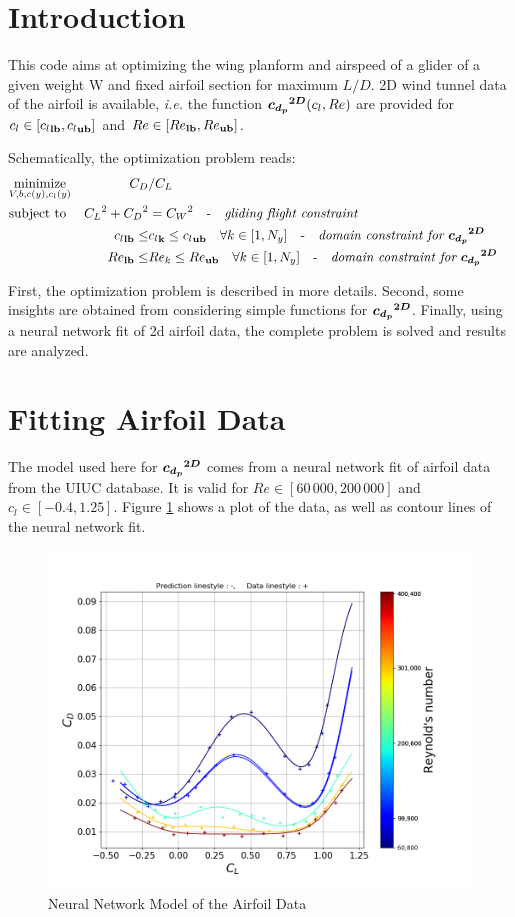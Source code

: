 \documentclass[letterpaper,12pt]{article}
\begin{document}
\section{Introduction}

This code aims at optimizing the wing planform and airspeed of a glider of a given weight W and fixed airfoil section for maximum $L/D$.
2D wind tunnel data of the airfoil is available, {\it i.e.} the function
$\boldsymbol{{c_{d_p}}^{2D}}(c_l, Re)$ are provided for  $c_l \in [{c_l}_{\bf lb}, {c_l}_{\bf ub}]$   and $Re \in [{Re}_{\bf lb}, {Re}_{\bf ub}]$.

Schematically, the optimization problem reads:
\begin{align*}
	& \underset{V, b, c(y), c_l(y)}{\text{minimize}} &  C_D &/ C_L  & \\
	& \text{subject to} 
	&  {C_L}^2 + {C_D}^2 &= {C_W}^2 \quad \text{-} \quad \text{\it gliding flight constraint} \\
	& & {c_l}_{\bf lb} \leq &{c_l}_{\bf k} \leq {c_l}_{\bf ub} \quad \forall k \in [1, N_y] \quad \text{-} \quad \text{\it domain constraint for } \boldsymbol{{c_{d_p}}^{2D}}  \\
	& & {Re}_{\bf lb} \leq &{Re_k} \leq {Re}_{\bf ub} \quad \forall k \in [1, N_y] \quad \text{-} \quad \text{\it domain constraint for } \boldsymbol{{c_{d_p}}^{2D}}
\end{align*}

First, the optimization problem is described in more details. 
Second, some insights are obtained from considering simple functions for $\boldsymbol{{c_{d_p}}^{2D}}$.
Finally, using a neural network fit of 2d airfoil data, the complete problem is solved and results are analyzed.

\section{Fitting Airfoil Data}

The model used here for $\boldsymbol{{c_{d_p}}^{2D}}$ comes from a neural network fit of airfoil data from the UIUC database. It is valid for $Re \in [60\,000, 200\,000]$ and $c_l \in [-0.4, 1.25]$. Figure \ref{fig:airfoil_data} shows a plot of the data, as well as contour lines of the neural network fit.

\begin{figure}[H]
	\centering
	\includegraphics[width=0.8\linewidth]{nn_e231}
	\caption{Neural Network Model of the Airfoil Data}
	\label{fig:airfoil_data}
\end{figure}
\end{document}
